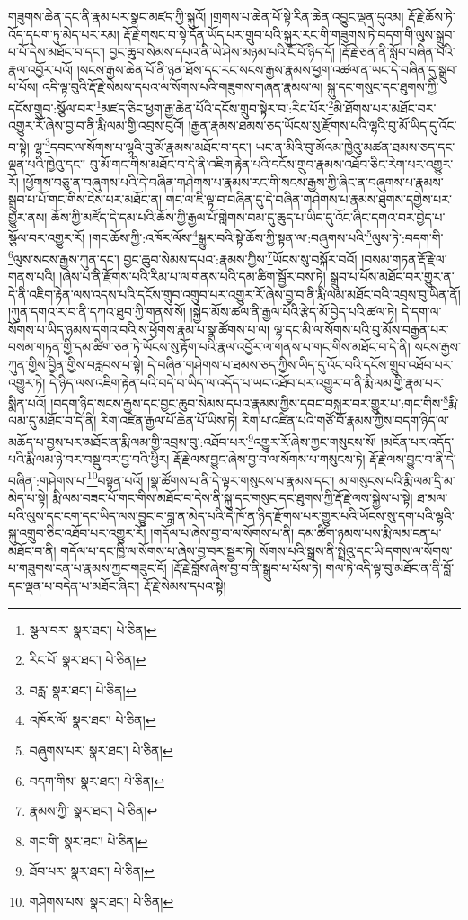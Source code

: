 གཟུགས་ཆེན་དང་ནི་རྣམ་པར་སྣང་མཛད་ཀྱི་སྐུའོ། །གྲགས་པ་ཆེན་པོ་སྟེ་རིན་ཆེན་འབྱུང་ལྡན་དུའམ། རྡོ་རྗེ་ཆོས་ཏེ་འོད་དཔག་ཏུ་མེད་པར་རམ། རྡོ་རྗེ་གསང་བ་སྟེ་དོན་ཡོད་པར་གྲུབ་པའི་སྐུར་རང་གི་གཟུགས་ཏེ་བདག་གི་ལུས་སྒྲུབ་པ་པོ་དེས་མཐོང་བ་དང་། བྱང་ཆུབ་སེམས་དཔའ་ནི་ཡེ་ཤེས་མཉམ་པའི་ངོ་བོ་ཉིད་དོ། །རྡོ་རྗེ་ཅན་ནི་སློབ་བཞིན་པའི་རྣལ་འབྱོར་པའོ། །སངས་རྒྱས་ཆེན་པོ་ནི་ཉན་ཐོས་དང་རང་སངས་རྒྱས་རྣམས་ཕྱག་འཚལ་ན་ཡང་དེ་བཞིན་དུ་སྒྲུབ་པ་པོས། འདི་ལྟ་བུའི་རྡོ་རྗེ་སེམས་དཔའ་ལ་སོགས་པའི་གཟུགས་གཞན་རྣམས་ལ། སྐུ་དང་གསུང་དང་ཐུགས་ཀྱི་དངོས་གྲུབ་:སྩོལ་བར་\footnote{སྩལ་བར་  སྣར་ཐང་།  པེ་ཅིན། }མཛད་ཅིང་ཕྱག་རྒྱ་ཆེན་པོའི་དངོས་གྲུབ་སྟེར་བ་:རིང་པོར་\footnote{རིང་པོ་  སྣར་ཐང་།  པེ་ཅིན། }མི་ཐོགས་པར་མཐོང་བར་འགྱུར་རོ་ཞེས་བྱ་བ་ནི་རྨི་ལམ་གྱི་འབྲས་བུའོ། །རྒྱན་རྣམས་ཐམས་ཅད་ཡོངས་སུ་རྫོགས་པའི་ལྷའི་བུ་མོ་ཡིད་དུ་འོང་བ་སྟེ། ལྷ་\footnote{བརླ་  སྣར་ཐང་།  པེ་ཅིན། }དབང་ལ་སོགས་པ་ལྷའི་བུ་མོ་རྣམས་མཐོང་བ་དང་། ཡང་ན་མིའི་བུ་མོའམ་ཁྱེའུ་མཚན་ཐམས་ཅད་དང་ལྡན་པའི་ཁྱེའུ་དང་། བུ་མོ་གང་གིས་མཐོང་བ་དེ་ནི་འཇིག་རྟེན་པའི་དངོས་གྲུབ་རྣམས་འཐོབ་ཅིང་རེག་པར་འགྱུར་རོ། །ཕྱོགས་བཅུ་ན་བཞུགས་པའི་དེ་བཞིན་གཤེགས་པ་རྣམས་རང་གི་སངས་རྒྱས་ཀྱི་ཞིང་ན་བཞུགས་པ་རྣམས་སྒྲུབ་པ་པོ་གང་གིས་ངེས་པར་མཐོང་ན། གང་ལ་ཇི་ལྟ་བ་བཞིན་དུ་དེ་བཞིན་གཤེགས་པ་རྣམས་ཐུགས་དགྱེས་པར་གྱུར་ནས། ཆོས་ཀྱི་མཛོད་དེ་དམ་པའི་ཆོས་ཀྱི་རྒྱལ་པོ་གླེགས་བམ་དུ་ཆུད་པ་ཡིད་དུ་འོང་ཞིང་དགའ་བར་བྱེད་པ་སྩོལ་བར་འགྱུར་རོ། །གང་ཆོས་ཀྱི་:འཁོར་ལོས་\footnote{འཁོར་ལོ་  སྣར་ཐང་།  པེ་ཅིན། }སྒྱུར་བའི་སྟེ་ཆོས་ཀྱི་སྟན་ལ་:བཞུགས་པའི་\footnote{བཞུགས་པར་  སྣར་ཐང་།  པེ་ཅིན། }ལུས་ཏེ་:བདག་གི་\footnote{བདག་གིས་  སྣར་ཐང་།  པེ་ཅིན། }ལུས་སངས་རྒྱས་ཀུན་དང་། བྱང་ཆུབ་སེམས་དཔའ་:རྣམས་ཀྱིས་\footnote{རྣམས་ཀྱི་  སྣར་ཐང་།  པེ་ཅིན། }ཡོངས་སུ་བསྐོར་བའོ། །བསམ་གཏན་རྡོ་རྗེ་ལ་གནས་པའི། །ཞེས་པ་ནི་རྫོགས་པའི་རིམ་པ་ལ་གནས་པའི་དམ་ཚིག་སྦྱོར་བས་ཏེ། སྒྲུབ་པ་པོས་མཐོང་བར་གྱུར་ན་དེ་ནི་འཇིག་རྟེན་ལས་འདས་པའི་དངོས་གྲུབ་འགྲུབ་པར་འགྱུར་རོ་ཞེས་བྱ་བ་ནི་རྨི་ལམ་མཐོང་བའི་འབྲས་བུ་ཡིན་ནོ། །ཀུན་དགའ་ར་བ་ནི་དཀའ་ཐུབ་ཀྱི་གནས་སོ། །སྐྱེད་མོས་ཚལ་ནི་རྒྱལ་པོའི་རྩེད་མོ་བྱེད་པའི་ཚལ་ཏེ། དེ་དག་ལ་སོགས་པ་ཡིད་ཉམས་དགའ་བའི་ས་ཕྱོགས་རྣམ་པ་སྣ་ཚོགས་པ་ལ། ལྷ་དང་མི་ལ་སོགས་པའི་བུ་མོས་བརྒྱན་པར་བསམ་གཏན་གྱི་དམ་ཚིག་ཅན་ཏེ་ཡོངས་སུ་རྟོག་པའི་རྣལ་འབྱོར་ལ་གནས་པ་གང་གིས་མཐོང་བ་དེ་ནི། སངས་རྒྱས་ཀུན་གྱིས་བྱིན་གྱིས་བརླབས་པ་སྟེ། དེ་བཞིན་གཤེགས་པ་ཐམས་ཅད་ཀྱིས་ཡིད་དུ་འོང་བའི་དངོས་གྲུབ་འཐོབ་པར་འགྱུར་ཏེ། དེ་ཉིད་ལས་འཇིག་རྟེན་པའི་བདེ་བ་ཡིད་ལ་འདོད་པ་ཡང་འཐོབ་པར་འགྱུར་བ་ནི་རྨི་ལམ་གྱི་རྣམ་པར་སྨིན་པའོ། །བདག་ཉིད་སངས་རྒྱས་དང་བྱང་ཆུབ་སེམས་དཔའ་རྣམས་ཀྱིས་དབང་བསྐུར་བར་གྱུར་པ་:གང་གིས་\footnote{གང་གི་  སྣར་ཐང་།  པེ་ཅིན། }རྨི་ལམ་དུ་མཐོང་བ་དེ་ནི། རིག་འཛིན་རྒྱལ་པོ་ཆེན་པོ་ཡིས་ཏེ། རིག་པ་འཛིན་པའི་གཙོ་བོ་རྣམས་ཀྱིས་བདག་ཉིད་ལ་མཆོད་པ་བྱས་པར་མཐོང་ན་རྨི་ལམ་གྱི་འབྲས་བུ་:འཐོབ་པར་\footnote{ཐོབ་པར་  སྣར་ཐང་།  པེ་ཅིན། }འགྱུར་རོ་ཞེས་ཀྱང་གསུངས་སོ། །མངོན་པར་འདོད་པའི་རྨི་ལམ་ཉེ་བར་བསྡུ་བར་བྱ་བའི་ཕྱིར། རྡོ་རྗེ་ལས་བྱུང་ཞེས་བྱ་བ་ལ་སོགས་པ་གསུངས་ཏེ། རྡོ་རྗེ་ལས་བྱུང་བ་ནི་དེ་བཞིན་:གཤེགས་པ་\footnote{གཤེགས་པས་  སྣར་ཐང་།  པེ་ཅིན། }བསྟན་པའོ། །སྣ་ཚོགས་པ་ནི་དེ་ལྟར་གསུངས་པ་རྣམས་དང་། མ་གསུངས་པའི་རྨི་ལམ་དྲི་མ་མེད་པ་སྟེ། རྨི་ལམ་བཟང་པོ་གང་གིས་མཐོང་བ་དེས་ནི་སྐུ་དང་གསུང་དང་ཐུགས་ཀྱི་རྡོ་རྗེ་ལས་སྐྱེས་པ་སྟེ། ཐ་མལ་པའི་ལུས་དང་ངག་དང་ཡིད་ལས་བྱུང་བ་བླ་ན་མེད་པའི་དེ་ཁོ་ན་ཉིད་རྫོགས་པར་གྱུར་པའི་ཡོངས་སུ་དག་པའི་ལྷའི་སྐུ་འགྲུབ་ཅིང་འཐོབ་པར་འགྱུར་རོ། །གདོལ་པ་ཞེས་བྱ་བ་ལ་སོགས་པ་ནི། དམ་ཚིག་ཉམས་པས་རྨི་ལམ་ངན་པ་མཐོང་བ་ནི། གདོལ་པ་དང་ཁྱི་ལ་སོགས་པ་ཞེས་བྱ་བར་སྦྱར་ཏེ། སོགས་པའི་སྒྲས་ནི་སྤྲེའུ་དང་ཡི་དགས་ལ་སོགས་པ་གཟུགས་ངན་པ་རྣམས་ཀྱང་གཟུང་ངོ། །རྡོ་རྗེ་བློས་ཞེས་བྱ་བ་ནི་སྒྲུབ་པ་པོས་ཏེ། གལ་ཏེ་འདི་ལྟ་བུ་མཐོང་ན་ནི་བློ་དང་ལྡན་པ་བདེན་པ་མཐོང་ཞིང་། རྡོ་རྗེ་སེམས་དཔའ་སྟེ། 